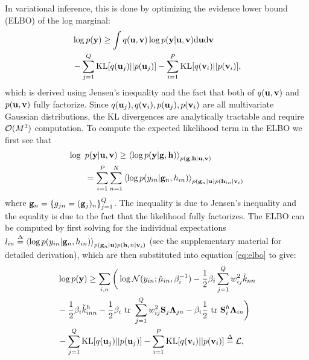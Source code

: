 \noindent
In variational inference, this is done by optimizing the evidence lower bound (ELBO) of the log marginal:
\begin{align}
\nonumber
&\log p(\mathbf{y}) \ge \int q(\mathbf{u}, \mathbf{v}) \log p(\mathbf{y} | \mathbf{u}, \mathbf{v})  \mathrm{d} \mathbf{u} \mathrm{d} \mathbf{v} \\
&- \sum_{j=1}^Q \text{KL}[q(\mathbf{u}_j) || p(\mathbf{u}_j)] - \sum_{i=1}^P \text{KL}[q(\mathbf{v}_i) || p(\mathbf{v}_i)],
\label{eq:elbo}
\end{align}
which is derived using Jensen's inequality and the fact that both of $q(\mathbf{u}, \mathbf{v})$ and $p(\mathbf{u}, \mathbf{v})$ fully factorize.
Since $q(\mathbf{u}_j), q(\mathbf{v}_i), p(\mathbf{u}_j), p(\mathbf{v}_i)$ are all multivariate Gaussian distributions, the KL divergences are analytically tractable and require $\mathcal{O}(M^3)$ computation. To compute the expected likelihood term in the ELBO we first see that
\begin{align}
\nonumber
\log \text{ } &p(\mathbf{y} | \mathbf{u}, \mathbf{v})
\ge \left\langle \log p(\mathbf{y} | \mathbf{g}, \mathbf{h}) \right\rangle_{p(\mathbf{g},\mathbf{h} | \mathbf{u}, \mathbf{v})}  \\
&= \sum_{i=1}^P \sum_{n=1}^N \left\langle \log p(y_{in} | \mathbf{g}_n, h_{in})  \right\rangle_{p(\mathbf{g}_n | \mathbf{u}) p(\mathbf{h}_{in} | \mathbf{v}_i)} 
\end{align}
where $\mathbf{g}_n = \{g_{jn} = (\mathbf{g}_j)_n\}_{j=1}^Q$.
The inequality is due to Jensen's inequality and the equality is due to the fact that the likelihood fully factorizes.
\newcommand{\Ahi}{\A^h_i}
\newcommand{\Zi}{\Z_i}
The ELBO can be computed by first solving for the individual expectations 
$l_{in} \overset{\Delta}{=} \left\langle \log p(y_{in} | \mathbf{g}_n, h_{in})  \right\rangle_{p(\mathbf{g}_n | \mathbf{u}) p(\mathbf{h}_in | \mathbf{v}_i)}$ (see the supplementary material for detailed derivation), which are then substituted into equation \ref{eq:elbo} to give:
\begin{align}
\nonumber
&\log p(\mathbf{y})
\ge \sum_{i,n}
\bigg( \log  \mathcal{N}(y_{in}; \tilde{\mu}_{in}, \beta_i^{-1})
          - \frac{1}{2} \beta_i \sum_{j=1}^Q w_{ij}^2 \tilde{k}_{nn} \\ \nonumber
         &- \frac{1}{2} \beta_i \tilde{k}^h_{inn}
         - \frac{1}{2} \beta_i \mbox{ \rm tr }  \sum_{j=1}^Q w_{ij}^2 \mathbf{S}_j \mathbf{\Lambda}_{jn} - \beta_i \frac{1}{2} \mbox{ \rm tr } \mathbf{S}^h_i \mathbf{\Lambda}_{in} 
\bigg) \\
&- \sum_{j=1}^Q \text{KL}[q(\mathbf{u}_j) || p(\mathbf{u}_j)] - \sum_{i=1}^P \text{KL}[q(\mathbf{v}_i) || p(\mathbf{v}_i)]  \overset{\Delta}{=} \mathcal{L},
\end{align}
